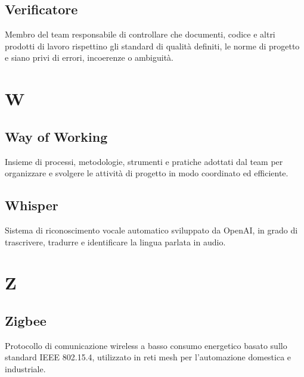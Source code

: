 \documentclass[a4paper,11pt]{article}
\begin{document}
\subsection{Verificatore}
Membro del team responsabile di controllare che documenti, codice e altri prodotti di lavoro rispettino gli standard di qualità definiti, le norme di progetto e siano privi di errori, incoerenze o ambiguità.

\newpage
\section{W}

\subsection{Way of Working}
Insieme di processi, metodologie, strumenti e pratiche adottati dal team per organizzare e svolgere le attività di progetto in modo coordinato ed efficiente.

\subsection{Whisper}
Sistema di riconoscimento vocale automatico sviluppato da OpenAI, in grado di trascrivere, tradurre e identificare la lingua parlata in audio.

\newpage
\section{Z}

\subsection{Zigbee}
Protocollo di comunicazione wireless a basso consumo energetico basato sullo standard IEEE 802.15.4, utilizzato in reti mesh per l'automazione domestica e industriale.
\end{document}
